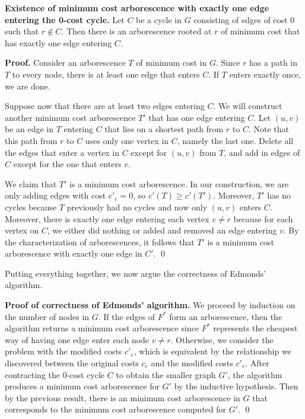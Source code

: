 \documentclass{article}
\begin{document}
{\color{violet}
{\bf Existence of minimum cost arborescence with exactly one edge 
entering the 0-cost cycle.} Let $C$ be a cycle in $G$ consisting of 
edges of cost $0$ such that $r \notin C$. Then there is an arborescence
rooted at $r$ of minimum cost that has exactly one edge entering $C$. 
}

{\color{blue}
{\bf Proof.} Consider an arborescence $T$ of minimum cost in $G$. 
Since $r$ has a path in $T$ to every node, there is at least one edge 
that enters $C$. If $T$ enters exactly once, we are done. 

Suppose now that there are at least two edges entering $C$. We will 
construct another minimum cost arborescence $T'$ that has one edge 
entering $C$. Let $(u, v)$ be an edge in $T$ entering $C$ that lies 
on a shortest path from $r$ to $C$. Note that this path from $r$ to 
$C$ uses only one vertex in $C$, namely the last one. Delete 
all the edges that enter a vertex in $C$ except for $(u, v)$ from $T$, 
and add in edges of $C$ except for the one that enters $v$. 

We claim that $T'$ is a minimum cost arborescence. In our construction, we are only 
adding edges with cost $c'_e = 0$, so $c'(T) \geq c'(T')$. Moreover, 
$T'$ has no cycles because $T$ previously had no cycles and now 
only $(u, v)$ enters $C$. Moreover, there is exactly one edge entering 
each vertex $v \neq r$ because for each vertex on $C$, we either did 
nothing or added and removed an edge entering $v$. By the 
characterization of arborescences, it follows that $T'$ is a minimum 
cost arborescence with exactly one edge in $C'$. \qed 
}

Putting everything together, we now argue the correctness of Edmonds' algorithm. 

{\color{blue} 
{\bf Proof of correctness of Edmonds' algorithm.} We proceed by induction 
on the number of nodes in $G$. If the edges of $F^*$ form an arborescence, 
then the algorithm returns a minimum cost arborescence since 
$F^*$ represents the cheapest way of having one edge enter each node $v \neq r$. 
Otherwise, we consider the problem with the modified costs $c'_e$, 
which is equivalent by the relationship we discovered between the 
original costs $c_e$ and the modified costs $c'_e$. After contracting 
the $0$-cost cycle $C$ to obtain the smaller graph $G'$, the algorithm 
produces a minimum cost arborescence for $G'$ by the inductive hypothesis. 
Then by the previous result, there is an minimum cost arborescence in $G$ 
that corresponds to the minimum cost arborescence computed for $G'$. \qed 
}
\end{document}

